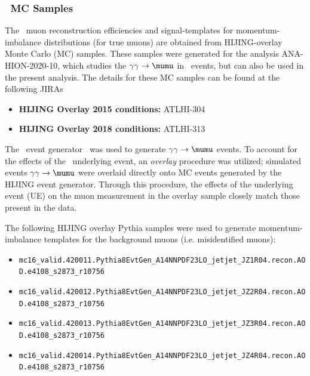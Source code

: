 \subsubsection{\PbPb\ MC Samples~\label{sec:PbPbMc}}
The \PbPb\ muon reconstruction efficiencies and signal-templates  
  for momentum-imbalance distributions (for true muons) are obtained 
  from HIJING-overlay Monte Carlo (MC) samples. 
These samples were generated for the analysis ANA-HION-2020-10, 
  which studies the $\gamma\gamma\rightarrow \mumu$ in \PbPb\ events,
  but can also be used in the present analysis.
The details for these MC samples can be found at the following JIRAs
\begin{itemize}
\item \textbf{HIJING Overlay 2015 conditions: } ATLHI-304~\cite{ATLHI-304}
\item \textbf{HIJING Overlay 2018 conditions: } ATLHI-313~\cite{ATLHI-313}
\end{itemize}
The \starlight\ event generator~\cite{Klein:2016yzr} was used to generate
  $\gamma\gamma\rightarrow \mumu$ events. 
To account for the effects of the \PbPb\ underlying event, an \emph{overlay}
  procedure was utilized; simulated events $\gamma\gamma\rightarrow \mumu$ 
  were overlaid directly onto MC events generated by the HIJING event generator.
Through this procedure, the effects of the underlying event (UE) 
  on the muon measurement in the overlay sample closely match 
  those present in the data.

The following HIJING overlay Pythia samples were used to generate 
  momentum-imbalance templates for the background muons (i.e. misidentified muons):
\begin{itemize}
  \item {\small \verb=mc16_valid.420011.Pythia8EvtGen_A14NNPDF23LO_jetjet_JZ1R04.recon.AOD.e4108_s2873_r10756=}
  \item {\small \verb=mc16_valid.420012.Pythia8EvtGen_A14NNPDF23LO_jetjet_JZ2R04.recon.AOD.e4108_s2873_r10756=}
  \item {\small \verb=mc16_valid.420013.Pythia8EvtGen_A14NNPDF23LO_jetjet_JZ3R04.recon.AOD.e4108_s2873_r10756=}
  \item {\small \verb=mc16_valid.420014.Pythia8EvtGen_A14NNPDF23LO_jetjet_JZ4R04.recon.AOD.e4108_s2873_r10756=}
\end {itemize}


